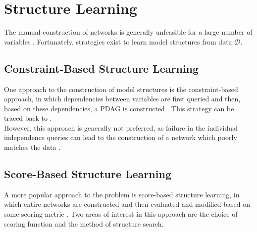 \documentclass [11pt]{article}
\begin{document}
\section{Structure Learning}\label{StructureLearning}
The manual construction of networks is generally unfeasible for a large number of variables \citep{koller09}. Fortunately, strategies exist to learn model structures from data $\mathcal{D}$.
\subsection{Constraint-Based Structure Learning}
One approach to the construction of model structures is the constraint-based approach, in which dependencies between variables are first queried and then, based on these dependencies, a PDAG is constructed \citep{koller09}. This strategy can be traced back to \citet{verma91}. 
\\
However, this approach is generally not preferred, as failure in the individual independence queries can lead to the construction of a network which poorly matches the data \citep{koller09}.
\subsection{Score-Based Structure Learning}\label{ScoreBasedStructureLearning}
A more popular approach to the problem is score-based structure learning, in which entire networks are constructed and then evaluated and modified based on some scoring metric \citep{koller09}. Two areas of interest in this approach are the choice of scoring function and the method of structure search.
\end{document}

